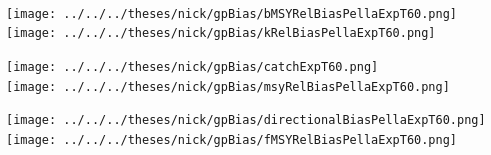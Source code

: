 \documentclass[ xcolor = pdftex, dvipsnames, table ]{beamer}
\begin{document}
{%
\begin{frame}%
$~$
\hspace*{-1.25cm}
\begin{minipage}[h!]{0.33\textwidth}
\hspace*{0.25cm}
\texttt{[image: ../../../theses/nick/gpBias/bMSYRelBiasPellaExpT60.png]}\\
\hspace*{0.25cm}
\texttt{[image: ../../../theses/nick/gpBias/kRelBiasPellaExpT60.png]}
\end{minipage}
\begin{minipage}[h!]{0.33\textwidth}
\hspace*{0.75cm}
\texttt{[image: ../../../theses/nick/gpBias/catchExpT60.png]}\\
\hspace*{0.75cm}
\texttt{[image: ../../../theses/nick/gpBias/msyRelBiasPellaExpT60.png]}
\end{minipage}
\begin{minipage}[h!]{0.33\textwidth}
\hspace*{1cm}
\texttt{[image: ../../../theses/nick/gpBias/directionalBiasPellaExpT60.png]}\\
\hspace*{1cm}
\texttt{[image: ../../../theses/nick/gpBias/fMSYRelBiasPellaExpT60.png]}
\end{minipage}
\end{frame}

}
\end{document}
